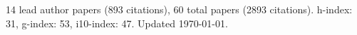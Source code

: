 14 lead author papers (893 citations),
60 total papers (2893 citations).\newline
h-index: 31, g-index: 53, i10-index: 47. Updated \today.